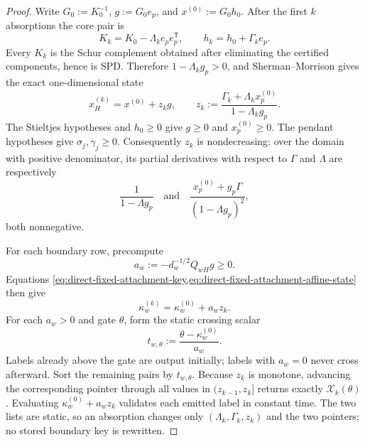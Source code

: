 \begin{proof}
Write $G_0:=K_0^{-1}$, $g:=G_0e_p$, and
$x^{(0)}:=G_0h_0$.  After the first $k$ absorptions the core pair is
\begin{equation*}
 K_k=K_0-\Lambda_ke_pe_p^\mathsf T,
 \qquad
 h_k=h_0+\Gamma_ke_p.
\end{equation*}
Every $K_k$ is the Schur complement obtained after eliminating the certified
components, hence is SPD.  Therefore
$1-\Lambda_k g_p>0$, and Sherman--Morrison gives the exact one-dimensional
state
\begin{equation}
 x_H^{(k)}=x^{(0)}+z_kg,
 \qquad
 z_k:=\frac{\Gamma_k+\Lambda_kx_p^{(0)}}
                {1-\Lambda_kg_p}.
 \label{eq:direct-fixed-attachment-affine-state}
\end{equation}
The Stieltjes hypotheses and $h_0\geq0$ give
$g\geq0$ and $x_p^{(0)}\geq0$.  The pendant hypotheses give
$\sigma_j,\gamma_j\geq0$.  Consequently $z_k$ is nondecreasing: over the
domain with positive denominator, its partial derivatives with respect to
$\Gamma$ and $\Lambda$ are respectively
\begin{equation*}
 \frac1{1-\Lambda g_p}
 \quad\text{and}\quad
 \frac{x_p^{(0)}+g_p\Gamma}{(1-\Lambda g_p)^2},
\end{equation*}
both nonnegative.

For each boundary row, precompute
\begin{equation}
 a_w:=-d_w^{-1/2}Q_{wH}g\geq0.
 \label{eq:direct-fixed-attachment-slope}
\end{equation}
Equations
\cref{eq:direct-fixed-attachment-key,eq:direct-fixed-attachment-affine-state}
then give
\begin{equation}
 \kappa_w^{(k)}=\kappa_w^{(0)}+a_wz_k.
 \label{eq:direct-fixed-attachment-affine-key}
\end{equation}
For each $a_w>0$ and gate $\theta$, form the static crossing scalar
\begin{equation*}
 t_{w,\theta}:=\frac{\theta-\kappa_w^{(0)}}{a_w}.
\end{equation*}
Labels already above the gate are output initially; labels with $a_w=0$
never cross afterward.  Sort the remaining pairs by $t_{w,\theta}$.  Because
$z_k$ is monotone, advancing the corresponding pointer through all values in
$(z_{k-1},z_k]$ returns exactly
$\mathcal X_k(\theta)$.  Evaluating
$\kappa_w^{(0)}+a_wz_k$ validates each emitted label in constant time.  The
two lists are static, so an absorption changes only
$(\Lambda_k,\Gamma_k,z_k)$ and the two pointers; no stored boundary key is
rewritten.


\end{proof}
